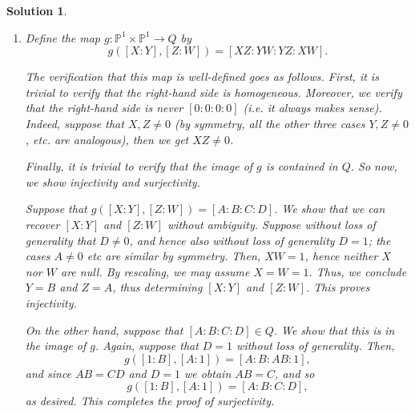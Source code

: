 \documentclass{article}
\theoremstyle{nonumberplain}
\newtheorem{sol}{Solution}
\newcommand{\PP}{\mathbb{P}}
\begin{document}
\begin{sol}
\begin{enumerate}
\item Define the map $g \colon \PP^1 \times \PP^1 \to Q$ by
\begin{equation}
g([X:Y],[Z:W]) = [XZ:YW:YZ:XW].
\end{equation}

The verification that this map is well-defined goes as follows. First, it is trivial to verify that the right-hand side is homogeneous. Moreover, we verify that the right-hand side is never $[0:0:0:0]$ (i.e. it always makes sense). Indeed, suppose that $X, Z \neq 0$ (by symmetry, all the other three cases $Y, Z \neq 0$, etc. are analogous), then we get $XZ \neq 0$.

Finally, it is trivial to verify that the image of $g$ is contained in $Q$. So now, we show injectivity and surjectivity.

Suppose that $g([X:Y], [Z:W]) = [A:B:C:D]$. We show that we can recover $[X:Y]$ and $[Z:W]$ without ambiguity. Suppose without loss of generality that $D \neq 0$, and hence also without loss of generality $D = 1$; the cases $A \neq 0$ etc are similar by symmetry. Then, $XW = 1$, hence neither $X$ nor $W$ are null. By rescaling, we may assume $X = W = 1$. Thus, we conclude $Y = B$ and $Z = A$, thus determining $[X:Y]$ and $[Z:W]$. This proves injectivity.

On the other hand, suppose that $[A:B:C:D] \in Q$. We show that this is in the image of $g$. Again, suppose that $D = 1$ without loss of generality. Then,
\begin{equation}
g([1:B],[A:1]) = [A:B:AB:1],
\end{equation}
and since $AB = CD$ and $D = 1$ we obtain $AB = C$, and so
\begin{equation}
g([1:B],[A:1]) = [A:B:C:D],
\end{equation}
as desired. This completes the proof of surjectivity.
\end{enumerate}
\end{sol}
\end{document}
